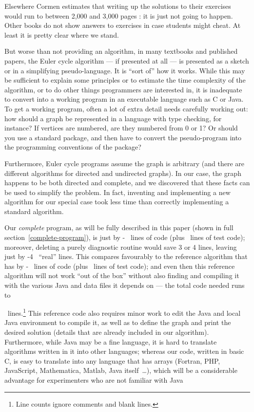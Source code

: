 \documentclass[12pt]{article}
\begin{document}
Elsewhere Cormen estimates that writing up the solutions to their exercises would run to between 2,000 and 3,000 pages \cite{cormen-web}: it is just not going to happen. Other books do not show answers to exercises in case students might cheat. At least it is pretty clear where we stand. 

But worse than not providing an algorithm, in many textbooks and published papers, the Euler cycle algorithm --- if presented at all ---  is presented as a sketch or in a simplifying pseudo-language. It is ``sort of'' how it works. While this may be sufficient to explain some principles or to estimate the time complexity of the algorithm, or to do other things programmers are interested in, it is inadequate to convert into a working program in an executable language such as C or Java. To get a working program, often a lot of extra detail needs carefully working out: how should a graph be represented in a language with type checking, for instance? If vertices are numbered, are they numbered from 0 or 1? Or should you use a standard package, and then have to convert the pseudo-program into the programming conventions of the package?

Furthermore, Euler cycle programs assume the graph is arbitrary (and there are different algorithms for directed and undirected graphs). In our case, the graph happens to be both directed and complete, and we discovered that these facts can be used to simplify the problem. In fact, inventing and implementing a new algorithm for our special case took less time than correctly implementing a standard algorithm. 

Our \emph{complete\/} program, as will be fully described in this paper (shown in full section~\ref{complete-program}), is just 
\newcount\testcode 
{} \advance\linesofcode by -\testcode
\the\linesofcode\ lines of code  (plus \the\testcode\ lines of test code); moreover, deleting a purely diagnostic routine would save 3 or 4 lines, leaving just
\advance \linesofcode by -4 \the\linesofcode\ ``real'' lines. This compares favourably to the reference algorithm \cite{sedgewickcode} that has 
 \advance\linesofcode by -\testcode
\the\linesofcode\ lines of code (plus \the\testcode\ lines of test code); and even then this reference algorithm will not work ``out of the box'' without also finding  and compiling it  with the various Java and data files it depends on --- the total code needed runs to   

\the\linesofcode\ lines.\footnote{Line counts ignore comments and blank lines.} This reference code also requires minor work to edit the Java and local Java environment to compile it, as well as to define the graph and print the desired solution (details that are already included in our algorithm). Furthermore, while Java may be a fine language, it is hard to translate algorithms written in it into other languages; whereas our code, written in basic C, is easy to translate into any language that has arrays (Fortran, PHP, JavaScript, Mathematica, Matlab, Java itself~\ldots), which will be a considerable advantage for experimenters who are not familiar with Java
\end{document}
